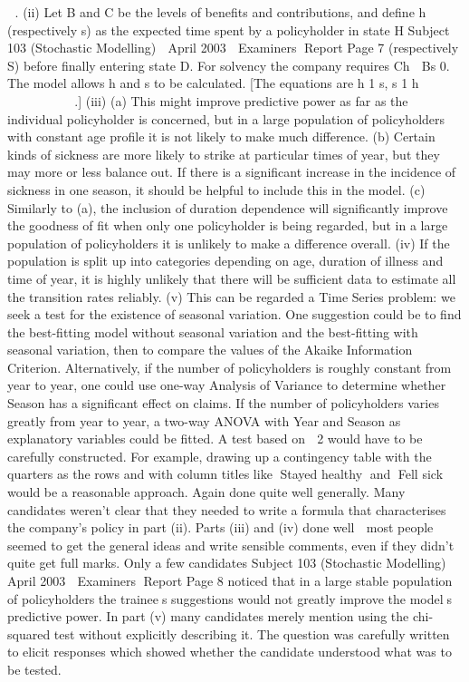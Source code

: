  
.
(ii) Let B and C be the levels of benefits and contributions, and define h
(respectively s) as the expected time spent by a policyholder in state H
Subject 103 (Stochastic Modelling)  April 2003  Examiners Report
Page 7
(respectively S) before finally entering state D. For solvency the company
requires Ch  Bs 
 0.
The model allows h and s to be calculated. [The equations are
h 1 s, s 1 h  
   
   
.]
(iii) (a) This might improve predictive power as far as the individual
policyholder is concerned, but in a large population of policyholders
with constant age profile it is not likely to make much difference.
(b) Certain kinds of sickness are more likely to strike at particular times of
year, but they may more or less balance out. If there is a significant
increase in the incidence of sickness in one season, it should be helpful
to include this in the model.
(c) Similarly to (a), the inclusion of duration dependence will significantly
improve the goodness of fit when only one policyholder is being
regarded, but in a large population of policyholders it is unlikely to
make a difference overall.
(iv) If the population is split up into categories depending on age, duration of
illness and time of year, it is highly unlikely that there will be sufficient data to
estimate all the transition rates reliably.
(v) This can be regarded a Time Series problem: we seek a test for the existence
of seasonal variation. One suggestion could be to find the best-fitting model
without seasonal variation and the best-fitting with seasonal variation, then to
compare the values of the Akaike Information Criterion.
Alternatively, if the number of policyholders is roughly constant from year to
year, one could use one-way Analysis of Variance to determine whether
Season has a significant effect on claims. If the number of policyholders
varies greatly from year to year, a two-way ANOVA with Year and Season as
explanatory variables could be fitted.
A test based on 
2 would have to be carefully constructed. For example,
drawing up a contingency table with the quarters as the rows and with column
titles like Stayed healthy and Fell sick would be a reasonable approach.
Again done quite well generally.
Many candidates weren’t clear that they needed to write a formula that characterises
the company’s policy in part (ii).
Parts (iii) and (iv) done well  most people seemed to get the general ideas and write
sensible comments, even if they didn’t quite get full marks. Only a few candidates
Subject 103 (Stochastic Modelling)  April 2003  Examiners Report
Page 8
noticed that in a large stable population of policyholders the trainees suggestions
would not greatly improve the models predictive power.
In part (v) many candidates merely mention using the chi-squared test without
explicitly describing it. The question was carefully written to elicit responses which
showed whether the candidate understood what was to be tested.
